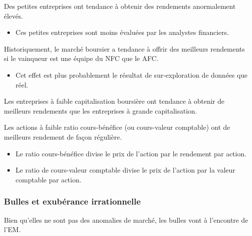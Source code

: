 \documentclass[10pt, french]{article}
\begin{document}
\begin{multicols*}{2}
\begin{definitionNOHFILLprop}
Des petites entreprises ont tendance à obtenir des rendements anormalement élevés. 

\begin{itemize}
	\item	Ces petites entreprises sont moins évaluées par les analystes financiers.
\end{itemize}
\end{definitionNOHFILLprop}

\begin{definitionNOHFILLprop}
Historiquement, le marché boursier a tendance à offrir des meilleurs rendements si le vainqueur est une équipe du NFC que le AFC.

\begin{itemize}
	\item	Cet effet est plus probablement le résultat de sur-exploration de données que réel.
\end{itemize}
\end{definitionNOHFILLprop}

\begin{definitionNOHFILLprop}
Les entreprises à faible capitalisation boursière ont tendance à obtenir de meilleurs rendements que les entreprises à grande capitalisation.
\end{definitionNOHFILLprop}

\begin{definitionNOHFILLprop}
Les actions à faible ratio cours-bénéfice (ou cours-valeur comptable) ont de meilleurs rendement de façon régulière.

\begin{itemize}
	\item	Le ratio cours-bénéfice divise le prix de l'action par le rendement par action.
	\item	Le ratio de cours-valeur comptable divise le prix de l'action par la valeur comptable par action.
\end{itemize}
\end{definitionNOHFILLprop}

\subsubsection{Bulles et exubérance irrationnelle}
Bien qu'elles ne sont pas des anomalies de marché, les bulles vont à l'encontre de l'EM.\\


\end{multicols*}
\end{document}
